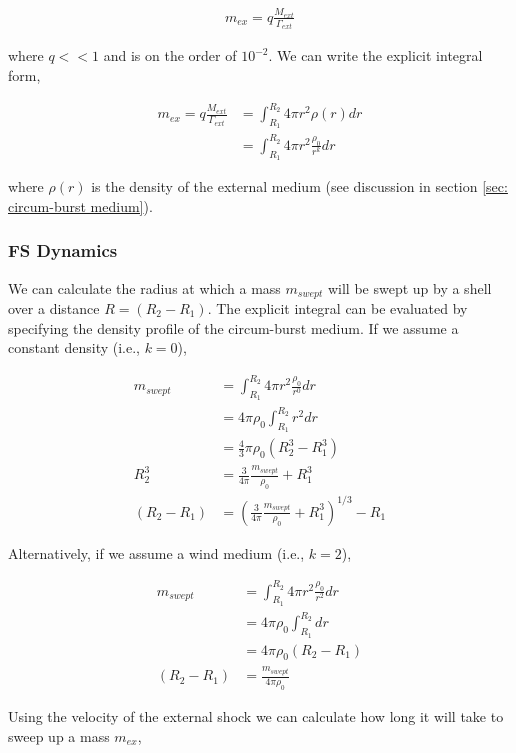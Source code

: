 \documentclass[linenumbers,twocolumn]{aastex631}
\begin{document}
\begin{align}
	m_{ex} = q\frac{M_{ext}}{\Gamma_{ext}}
\end{align}

where $q<<1$ and is on the order of $10^{-2}$. We can write the explicit integral form,

\begin{align} \label{eq: mex}
	m_{ex} = q\frac{M_{ext}}{\Gamma_{ext}} &= \int_{R_1}^{R_2} 4\pi r^2 \rho(r) dr \\
	&= \int_{R_1}^{R_2} 4\pi r^2 \frac{\rho_0}{r^k} dr
\end{align}

where $\rho(r)$ is the density of the external medium (see discussion in section \ref{sec: circum-burst medium}). 

\subsubsection{FS Dynamics}

We can calculate the radius at which a mass $m_{swept}$ will be swept up by a shell over a distance $R = (R_2 - R_1)$. The explicit integral can be evaluated by specifying the density profile of the circum-burst medium. If we assume a constant density (i.e., $k=0$), 

\begin{align}
	m_{swept} &= \int_{R_1}^{R_2} 4\pi r^2 \frac{\rho_0}{r^0} dr \\ 
	&= 4\pi \rho_0 \int_{R_1}^{R_2} r^2  dr \\
	&= \frac{4}{3}\pi \rho_0 (R_2^3 - R_1^3)\\
	R_2^3 &=  \frac{3}{4\pi} \frac{m_{swept}}{\rho_0} + R_1^3\\
	(R_2 - R_1) &= \left(\frac{3}{4\pi} \frac{m_{swept}}{\rho_0} + R_1^3\right)^{1/3} - R_1
\end{align}

Alternatively, if we assume a wind medium (i.e., $k=2$),

\begin{align}
	m_{swept} &= \int_{R_1}^{R_2} 4\pi r^2 \frac{\rho_0}{r^2} dr \\
	&= 4\pi \rho_0 \int_{R_1}^{R_2} dr \\
	&= 4\pi \rho_0 (R_2 - R_1) \\
	(R_2 - R_1) &= \frac{m_{swept}}{4 \pi \rho_0}
\end{align}

Using the velocity of the external shock we can calculate how long it will take to sweep up a mass $m_{ex}$,
\end{document}
